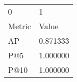 \begin{tabular}{ll}
0 & 1 \\
Metric & Value \\
AP & 0.871333 \\
P@5 & 1.000000 \\
P@10 & 1.000000 \\
\end{tabular}
